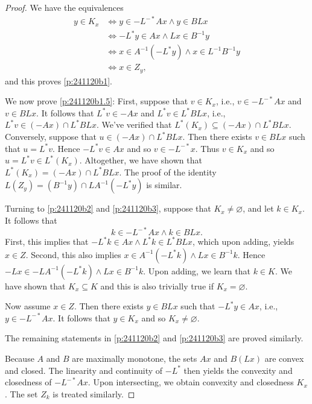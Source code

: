 \documentclass{article}
\providecommand{\siff}{\Leftrightarrow}
\begin{document}
\begin{proof}
We have the equivalences
\begin{subequations}
\begin{align}
y\in K_x
&\siff
y\in -L^{-*}Ax \land y \in BLx\\
&\siff
-L^*y \in Ax \land Lx \in B^{-1}y\\
&\siff
x \in A^{-1}(-L^*y) \land x \in L^{-1}B^{-1}y\\
&\siff
x\in Z_y,
\end{align}
\end{subequations}
and this proves \cref{p:241120b1}.

We now prove \cref{p:241120b1.5}:
First, suppose that $v\in K_x$, i.e., 
$v\in-L^{-*}Ax$ and $v\in BLx$.
It follows that $L^*v\in -Ax$ and $L^*v\in L^*BLx$, i.e., 
$L^*v \in (-Ax)\cap L^*BLx$. 
We've verified that $L^*(K_x)\subseteq (-Ax)\cap L^*BLx$. 
Conversely, suppose that $u\in (-Ax)\cap L^*BLx$. 
Then there exists $v\in BLx$ such that $u=L^*v$. 
Hence $-L^*v\in Ax$ and so $v\in -L^{-*}x$. 
Thus $v\in K_x$ and so $u = L^*v \in L^*(K_x)$. 
Altogether, we have shown that $L^*(K_x) = (-Ax)\cap L^*BLx$. 
The proof of the identity 
$L(Z_y)= (B^{-1}y)\cap LA^{-1}(-L^*y)$ is similar. 


Turning to \cref{p:241120b2} and \cref{p:241120b3}, 
suppose that 
$K_x\neq\varnothing$, and let $k\in K_x$. 
It follows that 
\begin{equation}
k\in -L^{-*}Ax \land k \in BLx.
\end{equation}
First, this implies that 
$-L^*k \in Ax \land L^*k\in L^*BLx$, which upon adding, yields 
$x \in Z$. 
Second, this also implies 
$x \in A^{-1}(-L^*k) \land Lx \in B^{-1}k$. 
Hence $-Lx \in -LA^{-1}(-L^*k) \land Lx \in B^{-1}k$. 
Upon adding, we learn that $k\in K$. 
We have shown that $K_x \subseteq K$ and this is also trivially true 
if $K_x=\varnothing$. 

Now assume $x\in Z$. 
Then there exists $y\in BLx$ such that 
$-L^*y\in Ax$, i.e., $y\in -L^{-*}Ax$.
It follows that $y \in K_x$ and so $K_x\neq\varnothing$. 

The remaining statements in \cref{p:241120b2} and \cref{p:241120b3}
are proved similarly.

Because $A$ and $B$ are maximally monotone, 
the sets 
$Ax$ and $B(Lx)$ are convex and closed. 
The linearity and continuity of $-L^*$ then 
yields the convexity and closedness of $-L^{-*}Ax$.
Upon intersecting, we obtain  convexity and closedness $K_x$. 
The set $Z_k$ is treated similarly. 
\end{proof}
\end{document}
